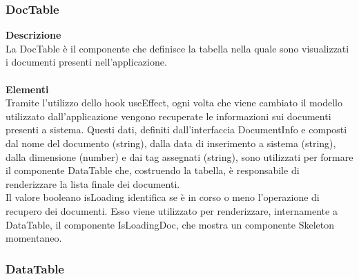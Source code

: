 \subsubsection{DocTable}

\textbf{Descrizione}\\
La DocTable è il componente che definisce la tabella nella quale sono visualizzati i documenti presenti nell'applicazione.\\ \\
\textbf{Elementi}\\
Tramite l'utilizzo dello hook useEffect, ogni volta che viene cambiato il modello utilizzato dall'applicazione vengono recuperate le informazioni sui documenti presenti a sistema. Questi dati, definiti dall'interfaccia DocumentInfo e composti dal nome del documento (string), dalla data di inserimento a sistema (string), dalla dimensione (number) e dai tag assegnati (string), sono utilizzati per formare il componente DataTable che, costruendo la tabella, è responsabile di renderizzare la lista finale dei documenti.\\
Il valore booleano isLoading identifica se è in corso o meno l'operazione di recupero dei documenti. Esso viene utilizzato per renderizzare, internamente a DataTable, il componente IsLoadingDoc, che mostra un componente Skeleton momentaneo.

\subsubsection{DataTable}

